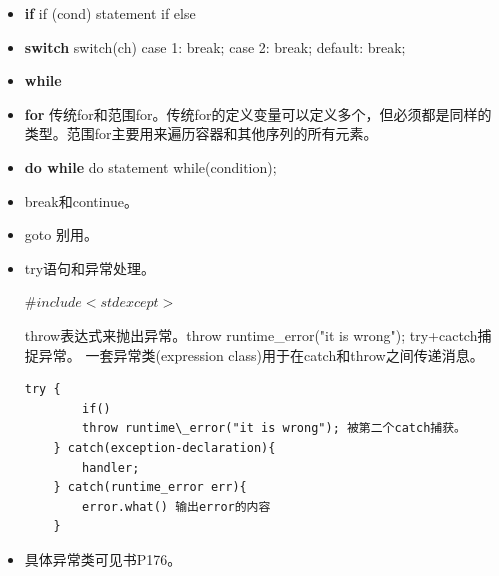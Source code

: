 \begin{itemize}
	\item \textbf{if} if (cond) statement if else
	\item \textbf{switch} switch(ch) {case 1: break; case 2: break; default: break;}
	\item \textbf{while} 
	\item \textbf{for} 传统for和范围for。传统for的定义变量可以定义多个，但必须都是同样的类型。范围for主要用来遍历容器和其他序列的所有元素。
	\item \textbf{do while} do statement while(condition);
	\item break和continue。
	\item goto 别用。
	\item try语句和异常处理。
	
	$\#include <stdexcept>$
	
	throw表达式来抛出异常。throw runtime\_error("it is wrong");
	try+cactch捕捉异常。
	一套异常类(expression class)用于在catch和throw之间传递消息。
	\begin{lstlisting}[caption={}]
	try {
		if()
		throw runtime\_error("it is wrong"); 被第二个catch捕获。
	} catch(exception-declaration){
		handler;
	} catch(runtime_error err){
		error.what() 输出error的内容
	}
	\end{lstlisting}
	\item 具体异常类可见书P176。
	
	
\end{itemize}

